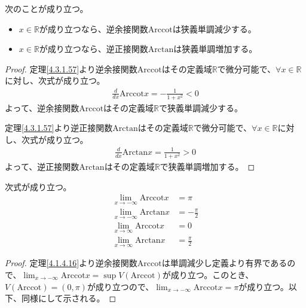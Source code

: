 \documentclass[dvipdfmx]{jsarticle}
\begin{document}
\begin{thm}\label{4.3.1.58} 次のことが成り立つ。
\begin{itemize}
\item
  $x \in \mathbb{R}$が成り立つなら、逆余接関数$\mathrm{Arccot}$は狭義単調減少する。
\item
  $x \in \mathbb{R}$が成り立つなら、逆正接関数$\mathrm{Arctan}$は狭義単調増加する。
\end{itemize}
\end{thm}
\begin{proof} 定理\ref{4.3.1.57}より逆余接関数$\mathrm{Arccot}$はその定義域$\mathbb{R}$で微分可能で、$\forall x \in \mathbb{R}$に対し、次式が成り立つ。
\begin{align*}
\frac{d}{dx}{\mathrm{Arccot}}x = - \frac{1}{1 + x^{2}} < 0
\end{align*}
よって、逆余接関数$\mathrm{Arccot}$はその定義域$\mathbb{R}$で狭義単調減少する。\par
定理\ref{4.3.1.57}より逆正接関数$\mathrm{Arctan}$はその定義域$\mathbb{R}$で微分可能で、$\forall x \in \mathbb{R}$に対し、次式が成り立つ。
\begin{align*}
\frac{d}{dx}{\mathrm{Arctan}}x = \frac{1}{1 + x^{2}} > 0
\end{align*}
よって、逆正接関数$\mathrm{Arctan}$はその定義域$\mathbb{R}$で狭義単調増加する。
\end{proof}
\begin{thm}\label{4.3.1.59} 次式が成り立つ。
\begin{align*}
  \lim_{x \rightarrow - \infty}{{\mathrm{Arccot}}x} &= \pi\\
  \lim_{x \rightarrow - \infty}{{\mathrm{Arctan}}x} &= - \frac{\pi}{2}\\
  \lim_{x \rightarrow \infty}{{\mathrm{Arccot}}x} &= 0\\
  \lim_{x \rightarrow \infty}{{\mathrm{Arctan}}x} &= \frac{\pi}{2}
\end{align*}
\end{thm}
\begin{proof} 定理\ref{4.1.4.16}より逆余接関数$\mathrm{Arccot}$は単調減少し定義より有界であるので、$\lim_{x \rightarrow - \infty}{{\mathrm{Arccot}}x} = \sup{V(\mathrm{Arccot})}$が成り立つ。このとき、$V(\mathrm{Arccot}) = (0,\pi)$が成り立つので、$\lim_{x \rightarrow - \infty}{{\mathrm{Arccot}}x} = \pi$が成り立つ。以下、同様にして示される。
\end{proof}
\end{document}
